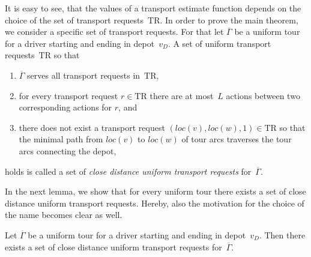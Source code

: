 \documentclass[english]{llncs}
\numberwithin{sublemma}{lemma}
\newcommand{\aloc}{\ensuremath{loc}}
\newcommand{\capd}{\ensuremath{L}}
\newcommand{\tourd}{\ensuremath{\Gamma}}
\newcommand{\TR}{\mathrm{TR}}
\begin{document}
It is easy to see, that the values of a transport estimate function depends on the choice of the set of transport requests~$\TR$.
In order to prove the main theorem, we consider a specific set of transport requests.
For that let $\overline{\tourd}$ be a uniform tour for a driver starting and ending in depot~$v_D$.
A set of uniform transport requests~$\TR$ so that
\begin{enumerate}
  \item \label{lem: static: reopt: existence tour: i}   $\overline{\tourd}$ serves all transport requests in~$\TR$,
  \item \label{lem: static: reopt: existence tour: ii}  for every transport request $r \in \TR$ there are at most~$\capd$ actions between two corresponding actions for $r$, and
  \item \label{lem: static: reopt: existence tour: iii} there does not exist a transport request $(\aloc(v), \aloc(w), 1) \in \TR$ so that the minimal path
                                                        from $\aloc(v)$ to $\aloc(w)$ of tour arcs traverses the tour arcs connecting the depot,
\end{enumerate}
holds is called a set of \emph{close distance uniform transport requests} for~$\overline{\tourd}$.

In the next lemma, we show that for every uniform tour there exists a set of close distance uniform transport requests.
Hereby, also the motivation for the choice of the name becomes clear as well.


\begin{lemma}
\label{lem: static: reopt: existence tour}
  Let $\overline{\tourd}$ be a uniform tour for a driver starting and ending in depot~$v_D$.
  Then there exists a set of close distance uniform transport requests for~$\overline{\tourd}$.
\end{lemma}
\end{document}
